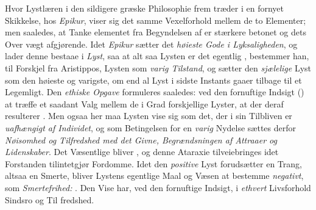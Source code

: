 Hvor Lystlæren i den sildigere græske Philosophie frem\-%
træder i en fornyet Skikkelse, hos \emph{Epikur}, viser sig det samme
Vexelforhold mellem de to Elementer; men saaledes, at Tanke\-%
elementet fra Begyndelsen af er stærkere betonet og dets Over\-%
vægt afgjørende. Idet \emph{Epikur} sætter det \emph{høieste Gode i
Lyksaligheden}, og lader denne bestaae i \emph{Lyst}, saa at alt\-%
saa Lysten er det egentlig , bestemmer han, til Forskjel
fra Aristippos, Lysten som \emph{varig Tilstand}, og sætter den
\emph{sjælelige} Lyst som den høieste og varigste, om end al Lyst
i sidste Instants gaaer tilbage til et Legemligt. Den \emph{ethiske
Opgave} formuleres saaledes: ved den fornuftige Indsigt () at træffe et saadant Valg mellem de i Grad forskjellige
Lyster, at der deraf resulterer . Men ogsaa her maa
Lysten vise sig som det, der i sin Tilbliven er \emph{uafhængigt
af Individet}, og som Betingelsen for en \emph{varig} Nydelse
sættes derfor \emph{Nøisomhed og Tilfredshed med det Givne,
Begrændsningen af Attraaer og Lidenskaber}. Det
Væsentlige bliver , og denne Ataraxie tilveiebringes idet Forstanden
tilintetgjør Fordomme. Idet den \emph{positive} Lyst forudsætter
en Trang, altsaa en Smerte, bliver Lystens egentlige Maal og
Væsen at bestemme \emph{negativt}, som \emph{Smertefrihed:} . Den Vise har, ved
den fornuftige Indsigt, i \emph{ethvert} Livsforhold Sindsro og Til\-%
fredshed.

